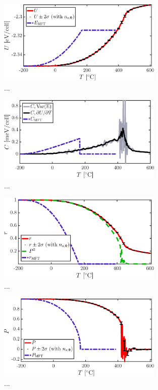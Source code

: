 \begin{figure}[!ht]
\begin{center}
  \includegraphics[width=0.7\textwidth]{../figures/U} 
  \caption{... }
  \label{fig:U}
\end{center}
\end{figure}

\begin{figure}[!ht]
\begin{center}
  \includegraphics[width=0.7\textwidth]{../figures/C} 
  \caption{... }
  \label{fig:C}
\end{center}
\end{figure}

\begin{figure}[!ht]
\begin{center}
  \includegraphics[width=0.7\textwidth]{../figures/r} 
  \caption{... }
  \label{fig:r}
\end{center}
\end{figure}

\begin{figure}[!ht]
\begin{center}
  \includegraphics[width=0.7\textwidth]{../figures/P} 
  \caption{... }
  \label{fig:P}
\end{center}
\end{figure}



